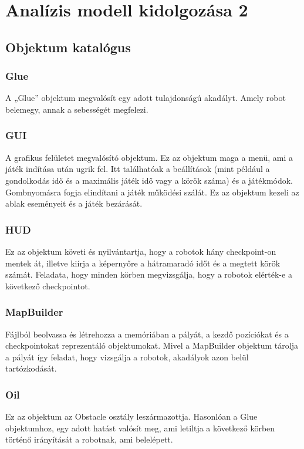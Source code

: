 %
\chapter{Analízis modell kidolgozása 2}

\thispagestyle{fancy}

\section{Objektum katalógus}

\subsection{Glue}
A „Glue” objektum megvalósít egy adott tulajdonságú akadályt. Amely robot belemegy, annak a sebességét megfelezi. 
\subsection{GUI}
A grafikus felületet megvalósító objektum. Ez az objektum maga a menü, ami a játék indítása után ugrik fel. Itt találhatóak a beállítások (mint például a gondolkodás idő és a maximális játék idő vagy a körök száma) és a játékmódok. Gombnyomásra fogja elindítani a játék működési szálát. Ez az objektum kezeli az ablak eseményeit és a játék bezárását.
\subsection{HUD}
Ez az objektum követi és nyilvántartja, hogy a robotok hány checkpoint-on mentek át, illetve kiírja a képernyőre a hátramaradó időt és a megtett körök számát. Feladata, hogy minden körben megvizsgálja, hogy a robotok elérték-e a következő checkpointot.
\subsection{MapBuilder}
Fájlból beolvassa és létrehozza a memóriában a pályát, a kezdő pozíciókat és a checkpointokat reprezentáló objektumokat.  Mivel a  MapBuilder objektum tárolja a pályát így feladat, hogy vizsgálja a robotok, akadályok azon belül tartózkodását.  
\subsection{Oil}
Ez az objektum az Obstacle osztály leszármazottja. Hasonlóan a Glue objektumhoz, egy adott hatást valósít meg, ami letiltja a következő körben történő irányítását a robotnak, ami belelépett.
